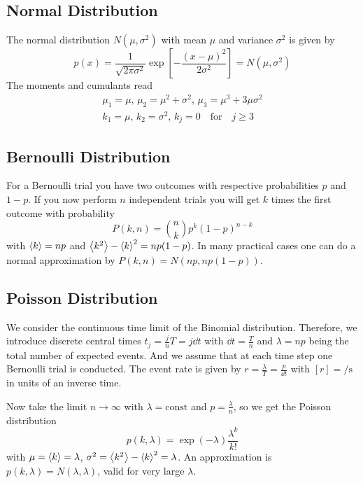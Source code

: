 \documentclass{notebook}
\begin{document}
\subsection*{Normal Distribution}

The normal distribution $N(\mu, \sigma^2)$ with mean $\mu$ and variance $\sigma^2$ is given by
%
\begin{equation}
p(x) = \frac{1}{\sqrt{2 \pi \sigma^2}} \exp[- \frac{(x- \mu)^2}{2 \sigma^2}] = N(\mu, \sigma^2)
\end{equation}
%
The moments and cumulants read
%
\begin{gather*}
	\mu_1 = \mu, \, \mu_2 = \mu^2 + \sigma^2, \, \mu_3 = \mu^3 + 3 \mu \sigma^2 \\
	k_1 = \mu, \, k_2 = \sigma^2, \, k_j = 0 \quad \mathrm{for} \quad j \geq 3
\end{gather*}
%

\subsection*{Bernoulli Distribution}

For a Bernoulli trial you have two outcomes with respective probabilities $p$ and $1 - p$. If you now perform $n$ independent trials you will get $k$ times the first outcome with probability
%
\begin{equation}
P(k,n) = \binom{n}{k} p^k (1 - p)^{n - k}
\end{equation}
%
with $\expval{k} = n p$ and $\expval{k^2} - \expval{k}^2 = n p (1 - p)$. In many practical cases one can do a normal approximation by $P(k,n) = N(np, n p (1 - p))$.

\subsection*{Poisson Distribution}

We consider the continuous time limit of the Binomial distribution. Therefore, we introduce discrete central times $t_j = \frac{j}{n} T = j \dd{t}$ with $\dd{t} = \frac{T}{n}$ and $\lambda = np$ being the total number of expected events. And we assume that at each time step one Bernoulli trial is conducted. The event rate is given by $r = \frac{\lambda}{T} = \frac{p}{\dd{t}}$ with $[r] = \si{\per \second}$ in units of an inverse time. 

Now take the limit $n \to \infty$ with $\lambda = \mathrm{const}$ and $p = \frac{\lambda}{n}$, so we get the Poisson distribution
%
\begin{equation}
p(k,\lambda) = \exp(-\lambda) \frac{\lambda^k}{k!}
\end{equation}
%
with $\mu = \expval{k} = \lambda$, $\sigma^2 = \expval{k^2} - \expval{k}^2 = \lambda$. An approximation is $p(k,\lambda) = N(\lambda, \lambda)$, valid for very large $\lambda$.
\end{document}
